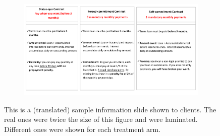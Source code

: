 \documentclass[oneside,11pt]{article}
\begin{document}
\begin{figure}[H]
     \caption{Explanatory Material}
    \label{ExplanatoryMaterial}
    \begin{center}
    \begin{subfigure}{\textwidth}
        \centering
        \includegraphics[width=\textwidth]{Figuras/micas.pdf}
    \end{subfigure}
    \end{center}
    \scriptsize
        This is a (translated) sample information slide shown to clients. The real ones were twice the size of this figure and were laminated. Different ones were shown for each treatment arm.
\end{figure}
\end{document}
